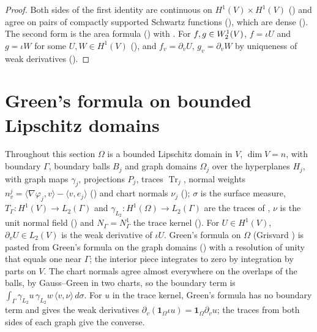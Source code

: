 \begin{proof}
\leanok
Both sides of the first identity are continuous on $H^1(V) \times H^1(V)$
() and agree on pairs of compactly supported Schwartz functions
(), which are dense (). The second
form is the area formula () with . For
$f, g \in W^{1}_{2}(V)$, $f = \iota U$ and $g = \iota W$ for some $U, W \in H^1(V)$
(), and $f_v = \partial_v U$, $g_v = \partial_v W$
by uniqueness of
weak derivatives ().
\end{proof}

\section{Green's formula on bounded Lipschitz domains}
\label{sec:lipschitz-domain-green}

Throughout this section $\Omega$ is a bounded Lipschitz domain in $V$, $\dim V = n$, with boundary
$\Gamma$, boundary balls $B_j$ and graph domains $\Omega_j$ over the hyperplanes $H_j$, with graph
maps $\gamma_j$, projections $P_j$, traces $\operatorname{Tr}_j$, normal weights
$n^j_v = \langle \nabla\varphi_j, v \rangle - \langle v, e_j \rangle$ ()
and chart normals $\nu_j$ (); $\sigma$ is the surface measure,
$T_\Gamma \colon H^1(V) \to L_2(\Gamma)$ and $\gamma_{L_2} \colon H^1(\Omega) \to L_2(\Gamma)$ are
the traces of , $\nu$ is the unit normal field
() and $N_\Gamma = N^1_\Gamma$ the trace kernel ().
For $U \in H^1(V)$, $\partial_v U \in L_2(V)$ is the weak derivative of $\iota U$. Green's formula
on $\Omega$ (Grisvard \cite[Theorem 1.5.3.1]{Grisvard}) is pasted from Green's formula on the graph
domains () with a resolution of unity that equals one near $\Gamma$; the
interior piece integrates to zero by integration by parts on $V$. The chart normals agree almost
everywhere on the overlaps of the balls, by Gauss--Green in two charts, so the boundary term is
$\int_\Gamma \gamma_{L_2} u \, \gamma_{L_2} w \, \langle v, \nu \rangle \, d\sigma$. For $u$ in the
trace kernel, Green's formula has no boundary term and gives the weak derivatives
$\partial_v(\mathbf 1_\Omega \iota u) = \mathbf 1_\Omega \partial_v u$; the traces from both sides
of each graph give the converse.

